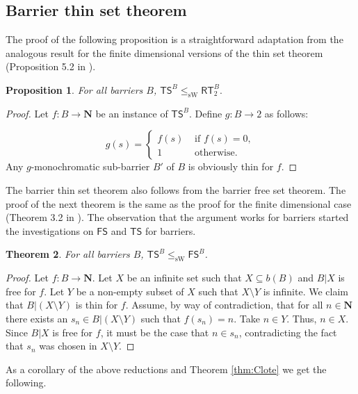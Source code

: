\documentclass{amsart}
\theoremstyle{plain}
\theoremstyle{plain}
\newtheorem{theorem}{Theorem}
\newtheorem{proposition}[theorem]{Proposition}
\newcommand\Nat{\mathbf{N}}
\newcommand\RT{\mathsf{RT}}
\newcommand\FreeS{\mathsf{FS}}
\newcommand\TS{\mathsf{TS}}
\newcommand\FS{\mathsf{FS}}
\newcommand\sW{\mathrm{sW}}
\begin{document}
\subsection{Barrier thin set theorem}\label{sub:thin}

The proof of the following proposition is a straightforward adaptation from the analogous result for the finite dimensional versions of the thin set theorem (Proposition 5.2 in \cite{Dorais.etal2015}).

\begin{proposition}
For all barriers $B$, $\TS^B \leq_{\sW} \RT^B_2.$
\end{proposition}

\begin{proof}
 Let $f: B \to \Nat$ be an instance of $\TS^B$. Define $g:B\to 2$ as follows:

$$
g(s) = \begin{cases}
f(s) & \mbox{ if } f(s) = 0,\\
1 & \mbox{ otherwise.}
\end{cases}
$$
Any $g$-monochromatic sub-barrier $B'$ of $B$ is obviously thin for $f$.
 \end{proof}

The barrier thin set theorem also follows from the barrier free set theorem. 
The proof of the next theorem is the same as the proof for the finite dimensional case (Theorem 3.2 in \cite{Cholak_Giusto_Hirst_Jockusch_2005}). The observation that the argument works for barriers started the investigations on $\FS$ and $\TS$ for barriers.

\begin{theorem}
For all barriers $B$, $ \TS^B \leq_{\sW}\FreeS^B $.
\end{theorem}

\begin{proof}
Let $f:B\to \Nat$. Let $X$ be an infinite set such that $X \subseteq b(B)$ and $B\vert X$ is free for $f$.
Let $Y$ be a non-empty subset of $X$ such that $X\setminus Y$ is infinite. 
We claim that $B\vert(X\setminus Y)$ is thin for $f$. 
Assume, by way of contradiction, that for all $n \in \Nat$ there exists an $s_n\in B\vert (X\setminus Y)$ such that $f(s_n) = n$. Take $n\in Y$. Thus, $n \in X$. Since $B\vert X$ is free for $f$, it must be the case that $n \in s_n$, contradicting the fact that $s_n$ was chosen in $X\setminus Y$. 
 \end{proof}




As a corollary of the above reductions and Theorem \ref{thm:Clote} we get the following.
\end{document}
